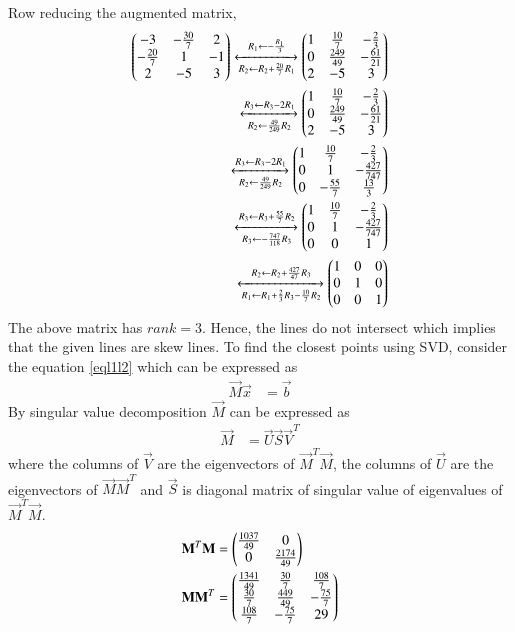 \documentclass[journal,12pt,twocolumn]{IEEEtran}
\begin{document}
Row reducing the augmented matrix, 
\begin{align}
	\begin{pmatrix}-3 & -\frac{30}{7} & 2\\ -\frac{20}{7} & 1 & -1\\ 2 & -5 & 3\end{pmatrix} \xleftrightarrow[R_2 \leftarrow R_2 + \frac{20}{7}R_1]{R_1 \leftarrow -\frac{R_1}{3}} \begin{pmatrix}1 & \frac{10}{7} & -\frac{2}{3}\\ 0 & \frac{249}{49} & -\frac{61}{21}\\ 2 & -5 & 3\end{pmatrix}\\
	\xleftrightarrow[R_2 \leftarrow \frac{49}{249}R_2]{R_3 \leftarrow R_3 - 2R_1} \begin{pmatrix}1 & \frac{10}{7} & -\frac{2}{3}\\ 0 & \frac{249}{49} & -\frac{61}{21}\\ 2 & -5 & 3\end{pmatrix}\\
	\xleftrightarrow[R_2 \leftarrow \frac{49}{249}R_2]{R_3 \leftarrow R_3 - 2R_1} \begin{pmatrix}1 & \frac{10}{7} & -\frac{2}{3}\\ 0 & 1 & -\frac{427}{747}\\ 0 & -\frac{55}{7} & \frac{13}{3}\end{pmatrix}\\
	\xleftrightarrow[R_3 \leftarrow -\frac{747}{118}R_3]{R_3 \leftarrow R_3 +\frac{55}{7}R_2} \begin{pmatrix}1 & \frac{10}{7} & -\frac{2}{3}\\ 0 & 1 & -\frac{427}{747}\\ 0 & 0& 1\end{pmatrix}\\
	\xleftrightarrow[R_1 \leftarrow R_1 + \frac{2}{3}R_3 - \frac{10}{7}R_2]{R_2 \leftarrow R_2 +\frac{427}{47}R_3} \begin{pmatrix}1 & 0 & 0\\ 0 & 1 & 0\\ 0 & 0& 1\end{pmatrix}
\end{align}
The above matrix has $rank = 3$. Hence, the lines do not intersect which implies that the given lines are skew lines. To find the closest points using SVD, consider the equation \eqref{eql1l2} which can be expressed as 
\begin{align}
	\vec{M}\vec{x}&=\vec{b}\label{mx=b}
\end{align}
By singular value decomposition $\vec{M}$
can be expressed as 
\begin{align}
	\vec{M}&=\vec{U}\vec{S}\vec{V}^T\label{main}
\end{align}
where the columns of $\vec{V}$ are the eigenvectors of $\vec{M}^T\vec{M}$, the columns of $\vec{U}$ are the eigenvectors of $\vec{M}\vec{M}^T$ and $\vec{S}$ is diagonal matrix of singular value of eigenvalues of $\vec{M}^T\vec{M}$.
\begin{align}
	\mathbf{M}^T\mathbf{M} &=\begin{pmatrix}\frac{1037}{49} & 0\\ 0 & \frac{2174}{49}\end{pmatrix}\\
	\mathbf{M}\mathbf{M}^T &=\begin{pmatrix}\frac{1341}{49} & \frac{30}{7} & \frac{108}{7}\\ \frac{30}{7} & \frac{449}{49} & -\frac{75}{7} \\ \frac{108}{7} & -\frac{75}{7} & 29\end{pmatrix}
\end{align}
\end{document}
